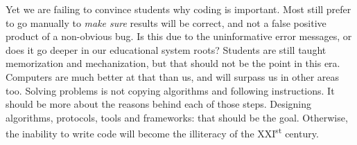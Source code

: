 Yet we are failing to convince students why coding is important. Most still prefer to go manually to \textit{make sure} results will be correct, and not a false positive product of a non-obvious bug. Is this due to the uninformative error messages, or does it go deeper in our educational system roots? Students are still taught memorization and mechanization, but that should not be the point in this era. Computers are much better at that than us, and will surpass us in other areas too. Solving problems is not copying algorithms and following instructions. It should be more about the reasons behind each of those steps. Designing algorithms, protocols, tools and frameworks: that should be the goal. Otherwise, the inability to write code will become the illiteracy of the XXI\textsuperscript{st} century.